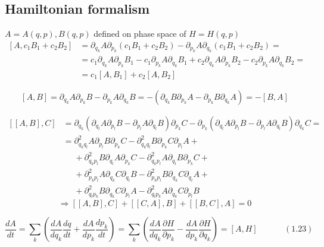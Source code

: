 \documentclass{book}
\newcommand{\exercisehead}[1]
  {\smallskip
   \noindent{\large\bf Exercise #1.}
   }
\begin{document}
\subsection{Hamiltonian formalism}

\exercisehead{1.1}  $A = A(q,p), B(q,p)$ defined on phase space of $H = H(q,p)$
\[
\begin{aligned}
  [A, c_1 B_1 + c_2 B_2 ] & = \partial_{q_k} A \partial_{p_k} (c_1 B_1 + c_2 B_2) - \partial_{p_k} A \partial_{q_k} ( c_1 B_1 + c_2 B_2) = \\
  & = c_1 \partial_{q_k} A \partial_{p_k} B_1 - c_1 \partial_{p_k} A \partial_{q_k} B_1 + c_2 \partial_{q_k} A \partial_{p_k} B_2 - c_2 \partial_{p_k} A \partial_{q_k} B_2 = \\
  & = c_1 [ A,B_1] + c_2 [A,B_2]
\end{aligned}
\]

\[
[A,B] = \partial_{q_k} A \partial_{p_k} B - \partial_{p_k} A \partial_{q_k} B = - (\partial_{q_k} B \partial_{p_k} A - \partial_{p_k} B \partial_{q_k} A ) = - [B,A]
\]

\[
\begin{aligned}
  [[A,B],C] & = \partial_{q_k} ( \partial_{q_l} A \partial_{p_l} B - \partial_{p_l} A \partial_{q_l} B ) \partial_{p_k} C - \partial_{p_k} ( \partial_{q_l} A \partial_{p_l} B - \partial_{p_l} A \partial_{q_l} B ) \partial_{q_k} C =  \\ 
  & = \partial^2_{q_k q_l} A \partial_{p_l} B \partial_{p_k} C - \partial^2_{q_k q_l} B \partial_{p_k} C \partial_{p_l} A + \\
  & \phantom{ = } + \partial^2_{q_k p_l} B \partial_{q_l} A \partial_{p_k} C - \partial^2_{q_k p_l} A \partial_{q_l} B \partial_{p_k} C + \\
  & \phantom{ = } + \partial^2_{p_k p_l} A \partial_{q_k} C \partial_{q_l} B - \partial^2_{p_k p_l } B \partial_{q_k} C \partial_{q_l} A + \\ 
  & \phantom{ = } + \partial^2_{q_l p_k} B \partial_{q_k} C \partial_{p_l}A - \partial^2_{q_l p_k} A \partial_{q_k} C \partial_{p_l} B
\end{aligned}
\]
\[
\Longrightarrow [[A,B], C ] + [[C,A], B] + [[B,C], A] = 0
\]

\begin{equation}
  \frac{dA}{dt} = \sum_k \left( \frac{ dA}{ dq_k } \frac{ dq}{ dt} + \frac{dA}{ dp_k } \frac{dp_k}{dt} \right) = \sum_k \left( \frac{dA}{ dq_k} \frac{ \partial H}{ \partial p_k} - \frac{ dA}{ d p_k} \frac{ \partial H}{ \partial q_k} \right) = [A,H] \quad \quad \quad \, (1.23)
\end{equation}
\end{document}

